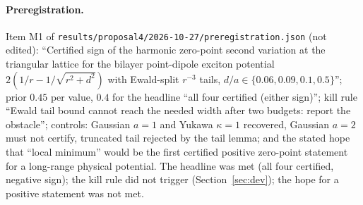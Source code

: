 \documentclass[11pt]{article}
\begin{document}
\paragraph{Preregistration.} Item M1 of \texttt{results/proposal4/2026-10-27/preregistration.json} (not edited): ``Certified sign of the harmonic zero-point second variation at the triangular lattice for the bilayer point-dipole exciton potential $2(1/r-1/\sqrt{r^2+d^2})$ with Ewald-split $r^{-3}$ tails, $d/a\in\{0.06,0.09,0.1,0.5\}$''; prior $0.45$ per value, $0.4$ for the headline ``all four certified (either sign)''; kill rule ``Ewald tail bound cannot reach the needed width after two budgets: report the obstacle''; controls: Gaussian $a=1$ and Yukawa $\kappa=1$ recovered, Gaussian $a=2$ must not certify, truncated tail rejected by the tail lemma; and the stated hope that ``local minimum'' would be the first certified positive zero-point statement for a long-range physical potential. The headline was met (all four certified, negative sign); the kill rule did not trigger (Section~\ref{sec:dev}); the hope for a positive statement was not met.

\end{document}
